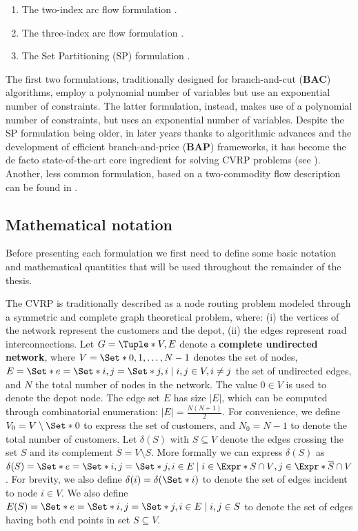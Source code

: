 \begin{enumerate}
	\setlength{\itemsep}{0pt}
	\setlength{\parskip}{0pt}

	\item The two-index arc flow formulation \parencite{laporte1983, laporte1985, laporte1986}.
	\item The three-index arc flow formulation \parencite{golden1977}.
	\item The Set Partitioning (SP) formulation \parencite{balinski1964}.
\end{enumerate}

The first two formulations, traditionally designed
for branch-and-cut (\textbf{BAC}) algorithms, employ a polynomial number of variables
but use an exponential number of constraints.
The latter formulation, instead, makes use of a polynomial number of constraints,
but uses an exponential number of variables.
Despite the SP formulation being older, in later years thanks to algorithmic advances
and the development of efficient branch-and-price (\textbf{BAP}) frameworks, it has become the de facto
state-of-the-art core ingredient for solving CVRP problems (see \cite{pessoa2020}).
Another, less common formulation, based on a two-commodity flow description
can be found in \textcite{baldacci2004}.



\subsection{Mathematical notation}
\label{sec:intro-cvrp-mathematical-notation}

Before presenting each formulation we first need to define some basic notation
and mathematical quantities that will be used throughout the remainder of the thesis.

The CVRP is traditionally described as a node routing problem modeled through a symmetric and complete graph theoretical problem,
where: (i) the vertices of the network represent the customers and the depot,
(ii) the edges represent road interconnections.
Let $G = \Tuple*{V, E}$ denote a \textbf{complete undirected network}, where $V = \Set*{0, 1, \dots, N - 1}$ denotes the set of nodes,
$E = \Set*{e = \Set*{i, j} = \Set*{j, i} \mid \allowbreak i,j \in V, \allowbreak i \ne j}$ the set of undirected edges,
and $N$ the total number of nodes in the network.
The value $0 \in V$ is used to denote the depot node.
The edge set $E$ has size $|E|$, which can be computed through combinatorial enumeration: $|E| = \frac{N (N+1)}{2}$.
For convenience, we define $V_0 = V \setminus \Set*{0}$ to express the set of customers,
and $N_0 = N - 1$ to denote the total number of customers.
Let $\delta(S)$ with $S \subseteq V$ denote the edges crossing the set $S$ and its complement $\overline{S} = V \setminus S$.
More formally we can express $\delta(S)$ as $\delta(S) = \Set*{ e = \Set*{i, j} = \Set*{j, i} \in E \mid i \in \Expr*{S \cap V}, j \in \Expr*{ \overline{S} \cap V } }$.
For brevity, we also define $\delta(i) = \delta(\Set*{i})$ to denote the set of edges incident to node $i \in V$.
We also define $E(S) = \Set*{e = \Set*{i, j} = \Set*{j, i}\in E \mid i, j \in S}$ to denote the set of edges having both end points in set $S \subseteq V$.

